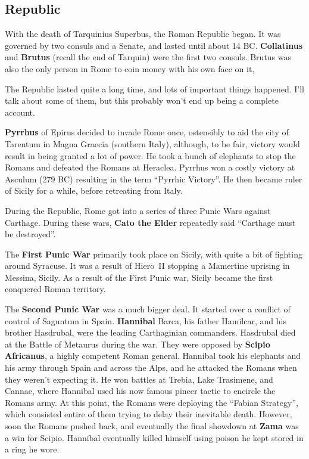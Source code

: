 \subsection*{Republic}

With the death of Tarquinius Superbus, the Roman Republic began.
It was governed by two consuls and a Senate, and lasted until about 14 BC\@.
\textbf{Collatinus} and \textbf{Brutus} (recall the end of Tarquin) were the first two consuls.
Brutus was also the only person in Rome to coin money with his own face on it,

The Republic lasted quite a long time, and lots of important things happened.
I'll talk about some of them, but this probably won't end up being a complete account.

\textbf{Pyrrhus} of Epirus decided to invade Rome once,
ostensibly to aid the city of Tarentum in Magna Graecia (southern Italy),
although, to be fair, victory would result in being granted a lot of power.
He took a bunch of elephants to stop the Romans and defeated the Romans at Heraclea.
Pyrrhus won a costly victory at Asculum (279 BC) resulting in the term ``Pyrrhic Victory''.
He then became ruler of Sicily for a while, before retreating from Italy.

During the Republic, Rome got into a series of three Punic Wars against Carthage.
During these wars, \textbf{Cato the Elder} repeatedly said ``Carthage must be destroyed''.

The \textbf{First Punic War} primarily took place on Sicily, with quite a bit of fighting around Syracuse.
It was a result of Hiero~II stopping a Mamertine uprising in Messina, Sicily.
As a result of the First Punic war, Sicily became the first conquered Roman territory.

The \textbf{Second Punic War} was a much bigger deal.
It started over a conflict of control of Saguntum in Spain.
\textbf{Hannibal} Barca, his father Hamilcar, and his brother Hasdrubal, were the leading Carthaginian commanders.
Hasdrubal died at the Battle of Metaurus during the war.
They were opposed by \textbf{Scipio Africanus}, a highly competent Roman general.
Hannibal took his elephants and his army through Spain and across the Alps,
and he attacked the Romans when they weren't expecting it.
He won battles at Trebia, Lake Trasimene, and Cannae,
where Hannibal used his now famous pincer tactic to encircle the Romans army.
At this point, the Romans were deploying the ``Fabian Strategy'',
which consisted entire of them trying to delay their inevitable death.
However, soon the Romans pushed back, and eventually the final showdown at \textbf{Zama} was a win for Scipio.
Hannibal eventually killed himself using poison he kept stored in a ring he wore.

